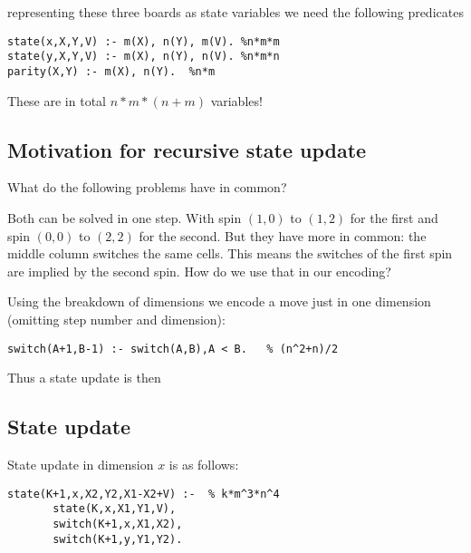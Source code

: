 \documentclass[]{llncs}
\newcommand{\spintable}[9]{ 
\node [matrix,ampersand replacement=\&,nodes={minimum size=4mm}]
{
    \node {#1}; \& \node{#2}; \& \node {#3}; \\ 
    \node {#4}; \& \node{#5}; \& \node {#6}; \\ 
    \node {#7}; \& \node{#8}; \& \node {#9}; \\ 
}; 
}
\begin{document}
representing these three boards as state variables we need
the following predicates

\begin{verbatim} 
state(x,X,Y,V) :- m(X), n(Y), m(V). %n*m*m 
state(y,X,Y,V) :- m(X), n(Y), n(V). %n*m*n 
parity(X,Y) :- m(X), n(Y).  %n*m 
\end{verbatim}

These are in total $n*m*(n+m)$ variables!

\subsection{Motivation for recursive state update}

What do the following problems have in common? 


Both can be solved in one step. With spin $(1,0)$ to $(1,2)$
for the first and spin $(0,0)$ to $(2,2)$ for the second.
But they have more in common: the middle column switches the
same cells. This means the switches of the first spin are
implied by the second spin. How do we use that in our
encoding?

Using the breakdown of dimensions we encode a move just in
one dimension (omitting step number and dimension):

\begin{verbatim} 
switch(A+1,B-1) :- switch(A,B),A < B.   % (n^2+n)/2 
\end{verbatim}

Thus a state update is then 


\subsection{State update} State update in dimension $x$ is as follows:

\begin{verbatim} 
state(K+1,x,X2,Y2,X1-X2+V) :-  % k*m^3*n^4 
       state(K,x,X1,Y1,V),
       switch(K+1,x,X1,X2), 
       switch(K+1,y,Y1,Y2).  
\end{verbatim}
\end{document}
